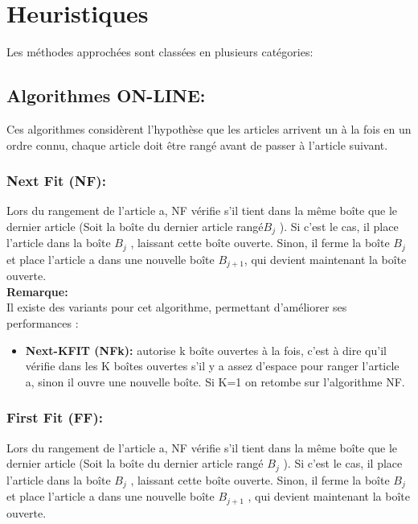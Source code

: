 \documentclass[class=report, crop=false]{standalone}
\begin{document}
        \section{Heuristiques}
        Les méthodes approchées  sont classées en plusieurs catégories:
        \subsection{Algorithmes ON-LINE:}
        Ces algorithmes considèrent l’hypothèse que les articles arrivent un à la fois en un ordre connu, chaque article doit être rangé avant de passer à l’article suivant.
        \subsubsection{Next Fit (NF):} Lors du rangement de l’article a, NF vérifie s'il tient dans la même boîte que le dernier article (Soit la boîte du dernier article rangé$B_j$ ). Si c’est le cas, il place l’article dans la boîte $B_j$ , laissant cette boîte ouverte. Sinon, il ferme la boîte $B_j$ et place l’article a dans une nouvelle boîte $B_{j+1}$, qui devient maintenant la boîte ouverte. 
        \\ \textbf{Remarque:} \\
        Il existe des variants pour cet algorithme, permettant d’améliorer ses performances : 
        \begin{itemize}
            \item \textbf{Next-KFIT (NFk): } autorise k boîte ouvertes à la fois, c’est à dire qu’il vérifie dans les K boîtes ouvertes s’il y a assez d’espace pour ranger l’article a, sinon il ouvre une nouvelle boîte. Si K=1 on retombe sur l’algorithme NF.
        \end{itemize}
        \subsubsection{First Fit (FF): } Lors du rangement de l’article a, NF vérifie s'il tient dans la même boîte que le dernier article (Soit la boîte du dernier article rangé $B_j$ ). Si c’est le cas, il place l’article dans la boîte $B_j$ , laissant cette boîte ouverte. Sinon, il ferme la boîte $B_j$ et place l’article a dans une nouvelle boîte $B_{j+1}$ , qui devient maintenant la boîte ouverte. 
\end{document}
